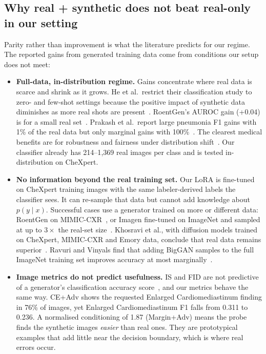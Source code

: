 \documentclass[twoside,english]{article}
\begin{document}
\subsection{Why real + synthetic does not beat real-only in our setting}\label{sec:whynot}
Parity rather than improvement is what the literature predicts for our regime. The reported gains from generated training data come from conditions our setup does not meet:
\begin{itemize}\setlength\itemsep{0pt}
\item \textbf{Full-data, in-distribution regime.} Gains concentrate where real data is scarce and shrink as it grows. He et al.\ restrict their classification study to zero- and few-shot settings because the positive impact of synthetic data diminishes as more real shots are present~\citep{he2023synthetic}. RoentGen's AUROC gain (+0.04) is for a small real set~\citep{chambon2022roentgen}. Prakash et al.\ report large pneumonia F1 gains with 1\% of the real data but only marginal gains with 100\%~\citep{prakash2025synthetic}. The clearest medical benefits are for robustness and fairness under distribution shift~\citep{ktena2024fairness}. Our classifier already has 214--1{,}369 real images per class and is tested in-distribution on CheXpert.
\item \textbf{No information beyond the real training set.} Our LoRA is fine-tuned on CheXpert training images with the same labeler-derived labels the classifier sees. It can re-sample that data but cannot add knowledge about $p(y\mid x)$. Successful cases use a generator trained on more or different data: RoentGen on MIMIC-CXR~\citep{chambon2022roentgen}, or Imagen fine-tuned on ImageNet and sampled at up to $3\times$ the real-set size~\citep{azizi2023synthetic}. Khosravi et al., with diffusion models trained on CheXpert, MIMIC-CXR and Emory data, conclude that real data remains superior~\citep{khosravi2024synthetically}. Ravuri and Vinyals find that adding BigGAN samples to the full ImageNet training set improves accuracy at most marginally~\citep{ravuri2019cas}.
\item \textbf{Image metrics do not predict usefulness.} IS and FID are not predictive of a generator's classification accuracy score~\citep{ravuri2019cas}, and our metrics behave the same way. CE+Adv shows the requested Enlarged Cardiomediastinum finding in 76\% of images, yet Enlarged Cardiomediastinum F1 falls from 0.311 to 0.236. A normalised conditioning of 1.87 (Margin+Adv) means the probe finds the synthetic images \emph{easier} than real ones. They are prototypical examples that add little near the decision boundary, which is where real errors occur.

\end{itemize}
\end{document}
